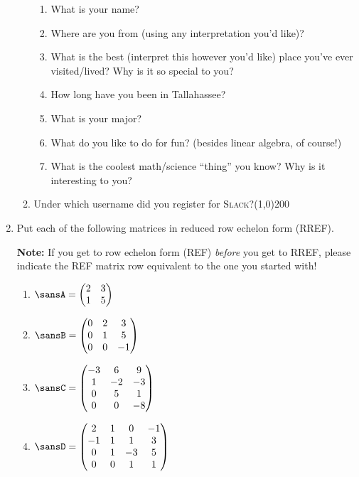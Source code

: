 \documentclass[12 pt]{article}
\newcommand{\pmat}[1]{\begin{pmatrix}#1\end{pmatrix}}
\begin{document}
\begin{enumerate}[leftmargin=0in, rightmargin=-0.25in]
\begin{enumerate}[itemsep=0.25in]
\begin{enumerate}[label=(\roman*),itemsep=3mm]
			\item What is your name?
			\item Where are you from (using any interpretation you'd like)?
			\item What is the best (interpret this however you'd like) place you've ever visited/lived? Why is it so special to you?
			\item How long have you been in Tallahassee?
			\item What is your major?
			\item What do you like to do for fun? (besides linear algebra, of course!)
			\item What is the coolest math/science ``thing'' you know? Why is it interesting to you?
		\end{enumerate}
		\item Under which username did you register for \textsc{Slack}?\hspace{6mm}\line(1,0){200}
	\end{enumerate}
	
	\item Put each of the following matrices in reduced row echelon form (RREF). 
	
	\textbf{Note:} If you get to row echelon form (REF) \textit{before} you get to RREF, please indicate the REF matrix row equivalent to the one you started with!
	\begin{enumerate}
		\item $\sansA=\pmat{2 & 3 \\ 1 & 5}$
		\item $\sansB=\pmat{0 & 2 & 3 \\ 0 & 1 & 5 \\ 0 & 0 & -1}$
		\item $\sansC=\pmat{-3 & 6 & 9 \\ 1 & -2 & -3 \\ 0 & 5 & 1 \\ 0 & 0 & -8}$
		\item $\sansD=\pmat{2 & 1 & 0 & -1 \\ -1 & 1 & 1 & 3 \\ 0 & 1 & -3 & 5 \\ 0 & 0 & 1 & 1}$
	\end{enumerate}
	

\end{enumerate}
\end{document}
